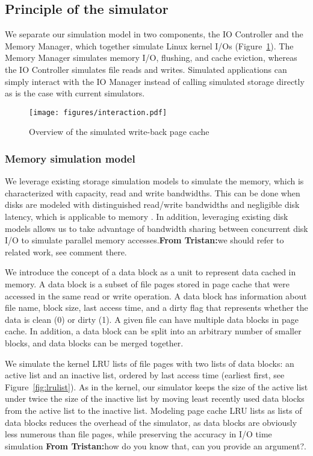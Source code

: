 \documentclass[conference]{IEEEtran}
\newcommand{\tristan}[1]{\color{orange}\textbf{From Tristan:}#1\color{black}}
\begin{document}
		\subsection{Principle of the simulator}
	
            We separate our simulation model in two components, the IO
			Controller and the Memory Manager, which together simulate Linux
			kernel I/Os (Figure~\ref{fig:interaction}). The Memory Manager
			simulates memory I/O, flushing, and cache eviction, whereas the IO
			Controller simulates file reads and writes. Simulated applications
			can simply interact with the IO Manager instead of calling simulated
			storage directly as is the case with current simulators.

			\begin{figure}
   				\centering
   				\texttt{[image: figures/interaction.pdf]}
   				\caption{Overview of the simulated write-back page cache}\label{fig:interaction}
			\end{figure}	

			\subsubsection{Memory simulation model}
			
			We leverage existing storage simulation models to simulate the memory,
			which is characterized with capacity, read and write bandwidths. 
			This can be done when disks are modeled with distinguished read/write 
			bandwidths and negligible disk latency, which is applicable to memory 
			\cite{lebre2015}. In addition, leveraging existing disk models allows us 
			to take advantage of bandwidth sharing between concurrent disk I/O to 
			simulate parallel memory accesses.\tristan{we should refer to related work, 
			see comment there}.

			We introduce the concept of a data block as a unit to represent data
			cached in memory. A data block is a subset of file pages stored in
			page cache that were accessed in the same read or write operation. 
			A data block has information about file name, block size, last access 
			time, and a dirty flag that represents whether the data is clean (0) 
			or dirty (1). 
			A given file can have multiple data blocks in page cache. In
			addition, a data block can be split into an arbitrary number of
			smaller blocks, and data blocks can be merged together.
			
			We simulate the kernel LRU lists of file pages
			with two lists of data blocks: an active list and 
			an inactive list, ordered by last access time (earliest first, see 
			Figure~\ref{fig:lrulist}).
			As in the kernel, our simulator keeps the size of the active list under
			twice the size of the inactive list by moving least recently 
			used data blocks from the active list to the inactive list. 
			Modeling page cache LRU lists as lists of data blocks reduces the
			overhead of the simulator, as data blocks are obviously less
			numerous than file pages, while preserving the accuracy in I/O time
			simulation \tristan{how do you know that, can you provide an argument?}.
\end{document}
